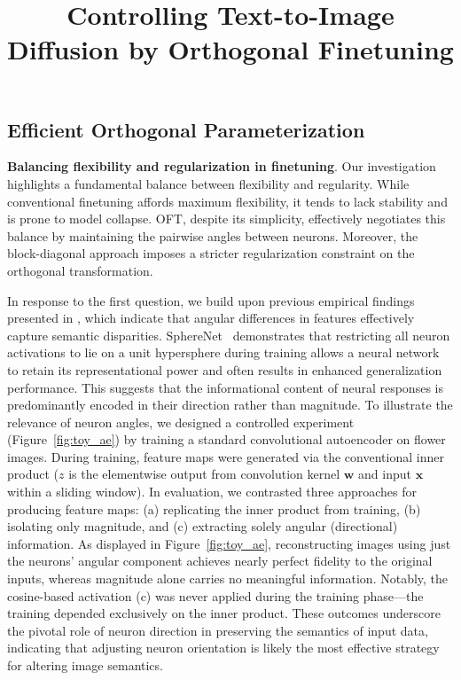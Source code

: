 \title{Controlling Text-to-Image Diffusion by Orthogonal Finetuning}
\subsection{Efficient Orthogonal Parameterization}\label{sect:eff_ortho}

\textbf{Balancing flexibility and regularization in finetuning}. Our investigation highlights a fundamental balance between flexibility and regularity. While conventional finetuning affords maximum flexibility, it tends to lack stability and is prone to model collapse. OFT, despite its simplicity, effectively negotiates this balance by maintaining the pairwise angles between neurons. Moreover, the block-diagonal approach imposes a stricter regularization constraint on the orthogonal transformation.

In response to the first question, we build upon previous empirical findings presented in \cite{liu2018decoupled,chen2020angular}, which indicate that angular differences in features effectively capture semantic disparities. SphereNet~\cite{liu2017deep} demonstrates that restricting all neuron activations to lie on a unit hypersphere during training allows a neural network to retain its representational power and often results in enhanced generalization performance. This suggests that the informational content of neural responses is predominantly encoded in their direction rather than magnitude. To illustrate the relevance of neuron angles, we designed a controlled experiment (Figure~\ref{fig:toy_ae}) by training a standard convolutional autoencoder on flower images. During training, feature maps were generated via the conventional inner product ($z$ is the elementwise output from convolution kernel $\bm{w}$ and input $\bm{x}$ within a sliding window). In evaluation, we contrasted three approaches for producing feature maps: (a) replicating the inner product from training, (b) isolating only magnitude, and (c) extracting solely angular (directional) information. As displayed in Figure~\ref{fig:toy_ae}, reconstructing images using just the neurons' angular component achieves nearly perfect fidelity to the original inputs, whereas magnitude alone carries no meaningful information. Notably, the cosine-based activation (c) was never applied during the training phase—the training depended exclusively on the inner product. These outcomes underscore the pivotal role of neuron direction in preserving the semantics of input data, indicating that adjusting neuron orientation is likely the most effective strategy for altering image semantics.

